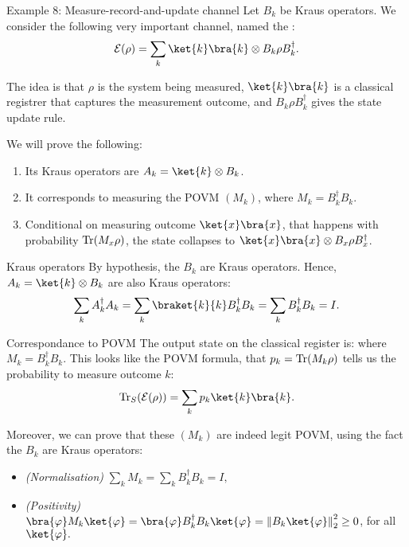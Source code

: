 \documentclass[a4paper]{article}
\begin{document}
\begin{parag}{Example 8: Measure-record-and-update channel}
    Let $B_k$ be Kraus operators. We consider the following very important channel, named the :
    \[\mathcal{E}\left(\rho\right) = \sum_{k} \ket{k}\bra{k} \otimes B_k \rho B_k^{\dagger}.\]

    The idea is that $\rho$ is the system being measured, $\ket{k}\bra{k}$ is a classical registrer that captures the measurement outcome, and $B_k \rho B_k^{\dagger}$ gives the state update rule. 

    We will prove the following:
    \begin{enumerate}[left=0pt]
        \item Its Kraus operators are $A_k = \ket{k} \otimes B_k$.
        \item It corresponds to measuring the POVM $\left(M_k\right)$, where $M_k = B_k^{\dagger} B_k$.
        \item Conditional on measuring outcome $\ket{x}\bra{x}$, that happens with probability $\Tr\left(M_x \rho\right)$, the state collapses to $\ket{x}\bra{x} \otimes B_x \rho B_x^{\dagger}$.
    \end{enumerate}

    \begin{subparag}{Kraus operators}
        By hypothesis, the $B_k$ are Kraus operators. Hence, $A_k = \ket{k} \otimes B_k$ are also Kraus operators:
        \[\sum_{k} A_k^{\dagger} A_k = \sum_{k} \braket{k}{k} B_k^{\dagger} B_k = \sum_{k} B_k^{\dagger} B_k = I.\]
    \end{subparag}

    \begin{subparag}{Correspondance to POVM}
        The output state on the classical register is: 
        where $M_k = B_k^{\dagger} B_k$. This looks like the POVM formula, that $p_k = \Tr\left(M_k \rho\right)$ tells us the probability to measure outcome $k$: 
        \[\Tr_S\left(\mathcal{E}\left(\rho\right)\right) = \sum_{k} p_k \ket{k} \bra{k}.\]
        
        Moreover, we can prove that these $\left(M_k\right)$ are indeed legit POVM, using the fact the $B_k$ are Kraus operators: 
        \begin{itemize}[left=0pt]
            \item \textit{(Normalisation)} $\sum_{k} M_k = \sum_{k} B_k^{\dagger} B_k = I,$
            \item \textit{(Positivity)} $\bra{\phi} M_k \ket{\phi} = \bra{\phi} B_k^{\dagger} B_k \ket{\phi} = \left\|B_k \ket{\phi}\right\|_2^2 \geq 0$, for all $\ket{\phi}.$
        \end{itemize}
    \end{subparag}


\end{parag}
\end{document}
